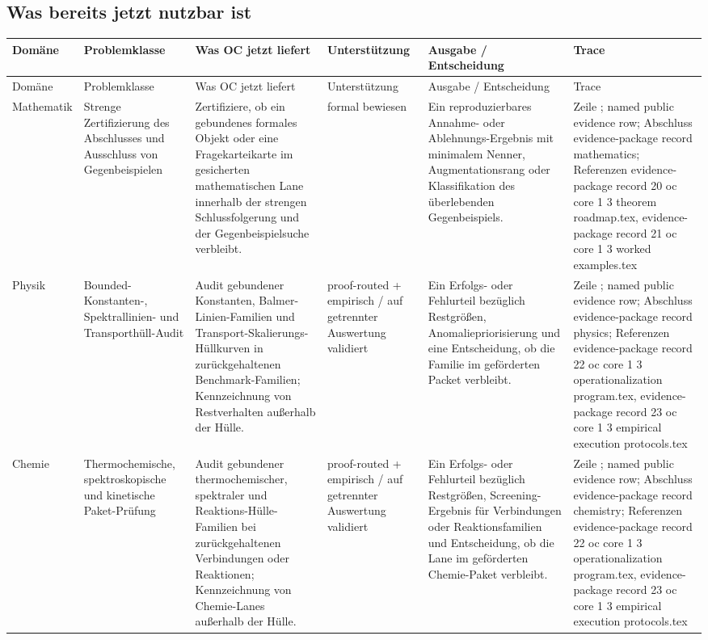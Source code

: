 \subsection{Was bereits jetzt nutzbar ist}
\begingroup
\scriptsize
\setlength{\emergencystretch}{1.5em}
\setlength{\tabcolsep}{2pt}
\setlength{\LTleft}{0pt}
\setlength{\LTright}{0pt}
\begin{longtable}{@{}L{0.11\textwidth}L{0.16\textwidth}L{0.19\textwidth}L{0.12\textwidth}L{0.18\textwidth}L{0.16\textwidth}@{}}
\toprule
Domäne & Problemklasse & Was OC jetzt liefert & Unterstützung & Ausgabe / Entscheidung & Trace \\
\midrule
\endfirsthead
\toprule
Domäne & Problemklasse & Was OC jetzt liefert & Unterstützung & Ausgabe / Entscheidung & Trace \\
\midrule
\endhead
Mathematik & Strenge Zertifizierung des Abschlusses und Ausschluss von Gegenbeispielen & Zertifiziere, ob ein gebundenes formales Objekt oder eine Fragekarteikarte im gesicherten mathematischen Lane innerhalb der strengen Schlussfolgerung und der Gegenbeispielsuche verbleibt. & formal bewiesen & Ein reproduzierbares Annahme- oder Ablehnungs-Ergebnis mit minimalem Nenner, Augmentationsrang oder Klassifikation des überlebenden Gegenbeispiels. & Zeile ; named public evidence row; \allowbreak Abschluss evidence-package record mathematics; \allowbreak Referenzen evidence-package record 20 oc core 1 3 theorem roadmap.tex, \allowbreak evidence-package record 21 oc core 1 3 worked examples.tex \\
Physik & Bounded-Konstanten-, Spektrallinien- und Transporthüll-\allowbreak Audit & Audit gebundener Konstanten, Balmer-Linien-Familien und Transport-Skalierungs-Hüllkurven in zurückgehaltenen Benchmark-Familien; Kennzeichnung von Restverhalten außerhalb der Hülle. & proof-routed + empirisch / auf getrennter Auswertung validiert & Ein Erfolgs- oder Fehlurteil bezüglich Restgrößen, Anomaliepriorisierung und eine Entscheidung, ob die Familie im geförderten Packet verbleibt. & Zeile ; named public evidence row; \allowbreak Abschluss evidence-package record physics; \allowbreak Referenzen evidence-package record 22 oc core 1 3 operationalization program.tex, \allowbreak evidence-package record 23 oc core 1 3 empirical execution protocols.tex \\
Chemie & Thermochemische, spektroskopische und kinetische Paket-Prüfung & Audit gebundener thermochemischer, spektraler und Reaktions-Hülle-Familien bei zurückgehaltenen Verbindungen oder Reaktionen; Kennzeichnung von Chemie-Lanes außerhalb der Hülle. & proof-routed + empirisch / auf getrennter Auswertung validiert & Ein Erfolgs- oder Fehlurteil bezüglich Restgrößen, Screening-Ergebnis für Verbindungen oder Reaktionsfamilien und Entscheidung, ob die Lane im geförderten Chemie-Paket verbleibt. & Zeile ; named public evidence row; \allowbreak Abschluss evidence-package record chemistry; \allowbreak Referenzen evidence-package record 22 oc core 1 3 operationalization program.tex, \allowbreak evidence-package record 23 oc core 1 3 empirical execution protocols.tex \\

\end{longtable}

